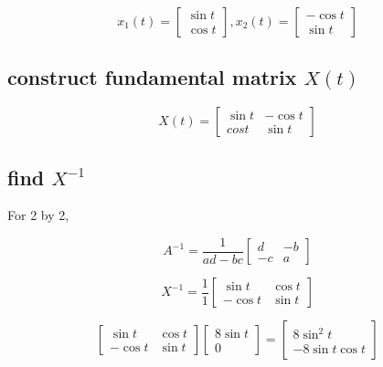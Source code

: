 \documentclass[twocolumn,draft]{article}
\begin{document}
  \begin{equation*}
	x_{1}(t) = \begin{bmatrix}
					\sin{t} \\
					\cos{t}
				\end{bmatrix} ,
	x_{2}(t) = \begin{bmatrix}
					-\cos{t} \\
					\sin{t}
				\end{bmatrix}
  \end{equation*}
  
  \subsection*{construct fundamental matrix $X(t)$}
  
  \begin{equation}
  	X(t) = \begin{bmatrix}
				\sin{t} & -\cos{t} \\
				cos{t} & \sin{t}
		  	\end{bmatrix}
  \end{equation}
  
  \subsection*{find $X^{-1}$}
  
  For 2 by 2,
  
  \begin{equation*}
  	A^{-1} = \frac{1}{ad-bc} \begin{bmatrix}
  								d & -b \\
								-c & a
  							 \end{bmatrix}
  \end{equation*}
  
  \begin{equation*}
  	X^{-1} = \frac{1}{1} \begin{bmatrix}
  							\sin{t} & \cos{t} \\
							-\cos{t} & \sin{t}
  						 \end{bmatrix}
  \end{equation*}
  
  \begin{equation*}
	\begin{bmatrix}
		\sin{t} & \cos{t} \\
		-\cos{t} & \sin{t}
	\end{bmatrix}
	\begin{bmatrix}
		8\sin{t} \\
		0
	\end{bmatrix}
	=
	\begin{bmatrix}
		8\sin^{2}{t} \\
		-8\sin{t}\cos{t}
	\end{bmatrix}
  \end{equation*}
  
\end{document}
